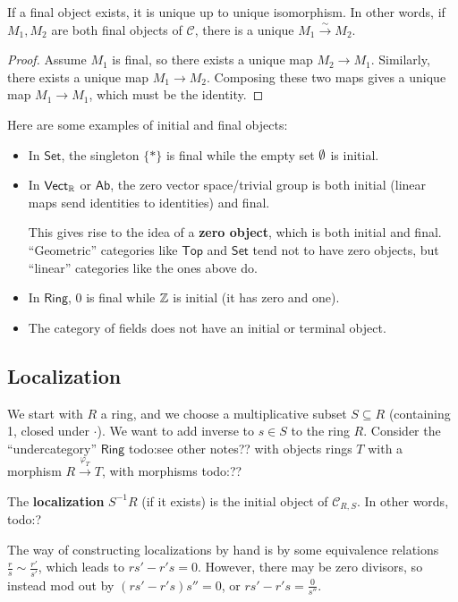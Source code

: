 \begin{prop}
    If a final object exists, it is unique up to unique isomorphism. In other words, if $M_1,M_2$ are both final objects of $\mathcal{C} $, there is a unique $M_1 \xrightarrow{\sim} M_2$.
\end{prop}
\begin{proof}
    Assume $M_1$ is final, so there exists a unique map $M_2 \to M_1$. Similarly, there exists a unique map $M_1 \to M_2$. Composing these two maps gives a unique map $M_1 \to M_1$, which must be the identity.
\end{proof}
\begin{example}
    Here are some examples of initial and final objects:
    \begin{itemize}
    \setlength\itemsep{-.2em}
\item In $\mathsf{Set} $, the singleton $\{*\} $ is final while the empty set $\emptyset$ is initial.
\item In $\mathsf{Vect} _{\mathbb{R}}$ or $\mathsf{Ab} $, the zero vector space/trivial group is both initial (linear maps send identities to identities) and final. 

    This gives rise to the idea of a \textbf{zero object}, which is both initial and final. ``Geometric'' categories like $\mathsf{Top} $ and $\mathsf{Set} $ tend not to have zero objects, but ``linear'' categories like the ones above do.
\item In $\mathsf{Ring} $, 0 is final while $\mathbb{Z}$ is initial (it has zero and one).
\item The category of fields does not have an initial or terminal object.
    \end{itemize}
\end{example}

\subsection{Localization}

We start with $R$ a ring, and we choose a multiplicative subset $S \subseteq R$ (containing 1, closed under $\cdot $). We want to add inverse to $s \in S$ to the ring $R$. Consider the ``undercategory'' $\mathsf{Ring} $ {\color{red}todo:see other notes??} with objects rings $T$ with a morphism $R \xrightarrow{\varphi _T} T$, with morphisms {\color{red}todo:??} 
\begin{definition}[]
    The \textbf{localization} $S ^{-1}R$ (if it exists) is the initial object of $\mathcal{C} _{R,S}$. In other words, {\color{red}todo:?} 
\end{definition}
The way of constructing localizations by hand is by some equivalence relations $\frac{r}{s}\sim \frac{r'}{s'}$, which leads to $rs'-r's=0$. However, there may be zero divisors, so instead mod out by $(rs'-r's)s''=0$, or $rs'-r's=\frac{0}{s''}$.

